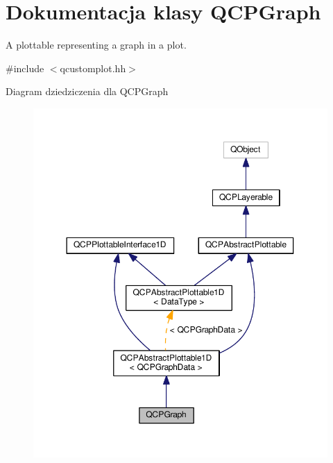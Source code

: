 \hypertarget{class_q_c_p_graph}{}\section{Dokumentacja klasy Q\+C\+P\+Graph}
\label{class_q_c_p_graph}


A plottable representing a graph in a plot.  




{\ttfamily \#include $<$qcustomplot.\+hh$>$}



Diagram dziedziczenia dla Q\+C\+P\+Graph\nopagebreak
\begin{figure}[H]
\begin{center}
\leavevmode
\includegraphics[width=350pt]{class_q_c_p_graph__inherit__graph}
\end{center}
\end{figure}


